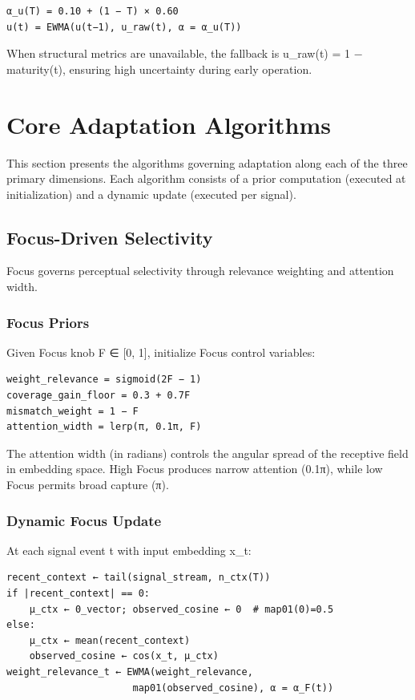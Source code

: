 \documentclass[
  letterpaper,
  DIV=11,
  numbers=noendperiod]{scrartcl}
\begin{document}
\begin{verbatim}
α_u(T) = 0.10 + (1 − T) × 0.60
u(t) = EWMA(u(t−1), u_raw(t), α = α_u(T))
\end{verbatim}

When structural metrics are unavailable, the fallback is u\_raw(t) = 1 −
maturity(t), ensuring high uncertainty during early operation.

\section{Core Adaptation Algorithms}\label{sec-core-adaptation}

This section presents the algorithms governing adaptation along each of
the three primary dimensions. Each algorithm consists of a prior
computation (executed at initialization) and a dynamic update (executed
per signal).

\subsection{Focus-Driven Selectivity}\label{focus-driven-selectivity}

Focus governs perceptual selectivity through relevance weighting and
attention width.

\subsubsection{Focus Priors}\label{focus-priors}

Given Focus knob F ∈ {[}0, 1{]}, initialize Focus control variables:

\begin{verbatim}
weight_relevance = sigmoid(2F − 1)
coverage_gain_floor = 0.3 + 0.7F
mismatch_weight = 1 − F
attention_width = lerp(π, 0.1π, F)
\end{verbatim}

The attention width (in radians) controls the angular spread of the
receptive field in embedding space. High Focus produces narrow attention
(0.1π), while low Focus permits broad capture (π).

\subsubsection{Dynamic Focus Update}\label{dynamic-focus-update}

At each signal event t with input embedding x\_t:

\begin{verbatim}
recent_context ← tail(signal_stream, n_ctx(T))
if |recent_context| == 0:
    μ_ctx ← 0_vector; observed_cosine ← 0  # map01(0)=0.5
else:
    μ_ctx ← mean(recent_context)
    observed_cosine ← cos(x_t, μ_ctx)
weight_relevance_t ← EWMA(weight_relevance,
                      map01(observed_cosine), α = α_F(t))
\end{verbatim}
\end{document}

